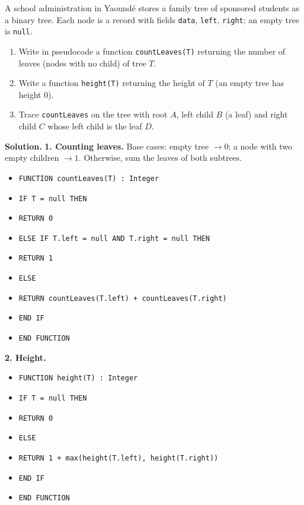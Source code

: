 \documentclass[11pt]{article}
\begin{document}
\begin{exoresolu}
A school administration in Yaoundé stores a family tree of sponsored students as a binary tree. Each node is a record with fields \texttt{data}, \texttt{left}, \texttt{right}; an empty tree is \texttt{null}.
\begin{enumerate}
\item Write in pseudocode a function \texttt{countLeaves(T)} returning the number of leaves (nodes with no child) of tree $T$.
\item Write a function \texttt{height(T)} returning the height of $T$ (an empty tree has height $0$).
\item Trace \texttt{countLeaves} on the tree with root $A$, left child $B$ (a leaf) and right child $C$ whose left child is the leaf $D$.
\end{enumerate}
\tcblower
\textbf{Solution.}
\textbf{1. Counting leaves.} Base cases: empty tree $\rightarrow 0$; a node with two empty children $\rightarrow 1$. Otherwise, sum the leaves of both subtrees.

\begin{itemize}
\item[] \texttt{FUNCTION countLeaves(T) : Integer}
\item[] \texttt{\quad IF T = null THEN}
\item[] \texttt{\quad\quad RETURN 0}
\item[] \texttt{\quad ELSE IF T.left = null AND T.right = null THEN}
\item[] \texttt{\quad\quad RETURN 1}
\item[] \texttt{\quad ELSE}
\item[] \texttt{\quad\quad RETURN countLeaves(T.left) + countLeaves(T.right)}
\item[] \texttt{\quad END IF}
\item[] \texttt{END FUNCTION}
\end{itemize}

\textbf{2. Height.}

\begin{itemize}
\item[] \texttt{FUNCTION height(T) : Integer}
\item[] \texttt{\quad IF T = null THEN}
\item[] \texttt{\quad\quad RETURN 0}
\item[] \texttt{\quad ELSE}
\item[] \texttt{\quad\quad RETURN 1 + max(height(T.left), height(T.right))}
\item[] \texttt{\quad END IF}
\item[] \texttt{END FUNCTION}
\end{itemize}


\end{exoresolu}
\end{document}
